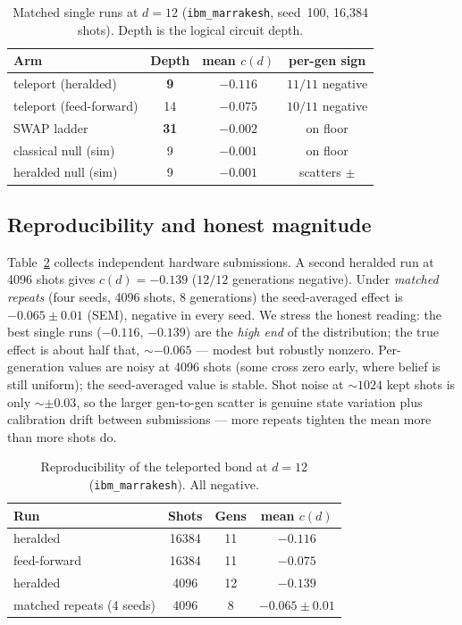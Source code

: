 \documentclass[conference]{IEEEtran}
\begin{document}
\begin{table}[H]
\caption{Matched single runs at $d{=}12$ (\texttt{ibm\_marrakesh}, seed~100, 16{,}384
shots). Depth is the logical circuit depth.}
\label{tab:head}
\centering
\small
\begin{tabular}{@{}lccc@{}}
\toprule
\textbf{Arm} & \textbf{Depth} & \textbf{mean $c(d)$} & \textbf{per-gen sign}\\
\midrule
teleport (heralded)      & \textbf{9}  & \textbf{$-0.116$} & $11/11$ negative\\
teleport (feed-forward)  & 14 & $-0.075$ & $10/11$ negative\\
SWAP ladder              & \textbf{31} & $-0.002$ & on floor\\
classical null (sim)     & 9  & $-0.001$ & on floor\\
heralded null (sim)      & 9  & $-0.001$ & scatters $\pm$\\
\bottomrule
\end{tabular}
\end{table}

\subsection{Reproducibility and honest magnitude}

Table~\ref{tab:repro} collects independent hardware submissions. A second heralded run at
4096 shots gives $c(d){=}-0.139$ ($12/12$ generations negative). Under \emph{matched
repeats} (four seeds, 4096 shots, 8 generations) the seed-averaged effect is
$-0.065\pm0.01$ (SEM), negative in every seed. We stress the honest reading: the best
single runs ($-0.116$, $-0.139$) are the \emph{high end} of the distribution; the true
effect is about half that, ${\sim}{-}0.065$ --- modest but robustly nonzero. Per-generation
values are noisy at 4096 shots (some cross zero early, where belief is still uniform); the
seed-averaged value is stable. Shot noise at ${\sim}1024$ kept shots is only ${\sim}\pm0.03$,
so the larger gen-to-gen scatter is genuine state variation plus calibration drift between
submissions --- more repeats tighten the mean more than more shots do.

\begin{table}[H]
\caption{Reproducibility of the teleported bond at $d{=}12$ (\texttt{ibm\_marrakesh}). All
negative.}
\label{tab:repro}
\centering
\small
\begin{tabular}{@{}lccc@{}}
\toprule
\textbf{Run} & \textbf{Shots} & \textbf{Gens} & \textbf{mean $c(d)$}\\
\midrule
heralded            & 16384 & 11 & $-0.116$\\
feed-forward        & 16384 & 11 & $-0.075$\\
heralded            & 4096  & 12 & $-0.139$\\
matched repeats (4 seeds) & 4096 & 8 & $\mathbf{-0.065\pm0.01}$\\
\bottomrule
\end{tabular}
\end{table}
\end{document}
